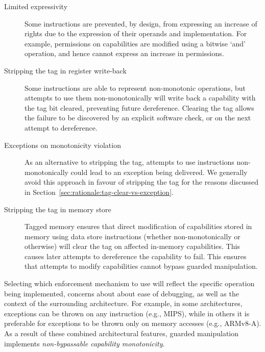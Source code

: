 \begin{description}
\item[Limited expressivity] Some instructions are prevented, by design, from
  expressing an increase of rights due to the expression of their operands and
  implementation.
  For example, permissions on capabilities are modified using a bitwise `and'
  operation, and hence cannot express an increase in permissions.

\item[Stripping the tag in register write-back] Some instructions are able to
  represent non-monotonic operations, but attempts to use them
  non-monotonically will write back a capability with the tag bit
  cleared, preventing future dereference.
  Clearing the tag allows the failure to be discovered by an explicit
  software check, or on the next attempt to dereference.

\item[Exceptions on monotonicity violation] As an alternative to stripping
  the tag, attempts to use instructions non-monotonically could lead to an
  exception being delivered.
  We generally avoid this approach in favour of stripping the tag for the
  reasons discussed in Section~\ref{sec:rationale:tag-clear-vs-exception}.

\item[Stripping the tag in memory store] Tagged memory ensures that direct
  modification of capabilities stored in memory using data store instructions
  (whether non-monotonically or otherwise) will clear the tag on affected
  in-memory capabilities.
  This causes later attempts to dereference the capability to fail.
  This ensures that attempts to modify capabilities cannot bypass guarded
  manipulation.

\end{description}

Selecting which enforcement mechanism to use will reflect the specific
operation being implemented, concerns about about ease of debugging, as well
as the context of the surrounding architecture. For example, in some
architectures, exceptions can be thrown on any instruction (e.g., MIPS), while
in others it is preferable for exceptions to be thrown only on memory
accesses (e.g., ARMv8-A).
As a result of these combined architectural features, guarded manipulation
implements \textit{non-bypassable capability monotonicity}.

